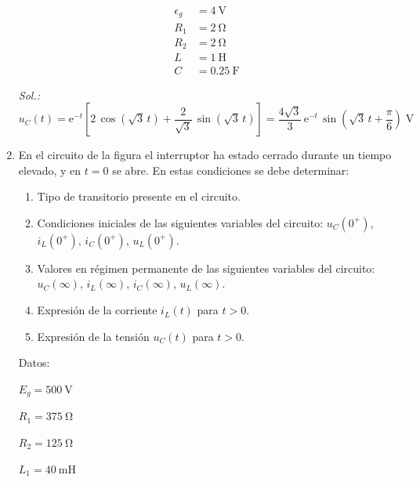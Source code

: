 \begin{enumerate}
\begin{minipage}{0.5\linewidth}
  \begin{align*}
    \epsilon_g &= \SI{4}{\volt}\\
    R_1 &= \SI{2}{\ohm}\\
    R_2 &= \SI{2}{\ohm}\\
    L &= \SI{1}{\henry}\\
    C &= \SI{0.25}{\farad}      
  \end{align*}
  \end{minipage}

  \emph{Sol.:\;
    $u_C(t)=
    \mathrm{e}^{-t}\left[2\,\cos(\sqrt{3}\,t)+\dfrac{2}{\sqrt{3}}\,\sin(\sqrt{3}\,t)\right]=\dfrac{4\sqrt{3}}{3}\,\mathrm{e}^{-t}\,\sin\left(\sqrt{3}\,t+\dfrac{\pi}{6}\right) \;\si{\volt}$
    }

\item En el circuito de la figura el interruptor ha estado cerrado
  durante un tiempo elevado, y en $t = 0$ se abre. En estas
  condiciones se debe determinar:

  \begin{enumerate}
  \item Tipo de transitorio presente en el circuito.

  \item Condiciones iniciales de las siguientes variables del
    circuito: $u_C(0^+)$, $i_L(0^+)$, $i_C(0^+)$, $u_L(0^+)$.
  \item Valores en régimen permanente de las siguientes variables del
    circuito: $u_C(\infty)$, $i_L(\infty)$, $i_C(\infty)$,
    $u_L(\infty)$.
  \item Expresión de la corriente $i_L(t)$ para $t > 0$.
  \item Expresión de la tensión $u_C(t)$ para $t > 0$.
  \end{enumerate}

\begin{minipage}{0.3\linewidth}
  Datos:
    \vspace{2mm}

  $E_g = \SI{500}{\volt}$

  $R_{1}= \SI{375}{\ohm}$%

  $R_{2}=\SI{125}{\ohm}$%

  $L_1 = \SI{40}{\milli\henry}$%


\end{minipage}
\end{enumerate}
